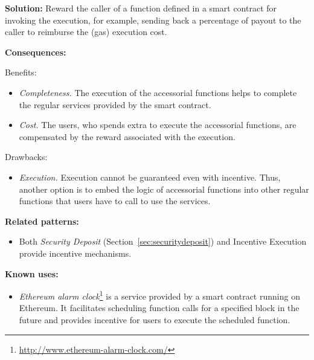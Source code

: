 \vspace{0.5em}\noindent \textbf{Solution:} 
Reward the caller of a function defined in a smart contract for invoking the execution, for example, sending back a percentage of payout to the caller to reimburse the (gas) execution cost. 

\vspace{0.5em}\noindent \textbf{Consequences:} 

Benefits:
\begin{itemize}
  \item \textit{Completeness.} The execution of the accessorial functions helps to complete the regular services provided by the smart contract.
  \item \textit{Cost.} The users, who spends extra to execute the accessorial functions, are compensated by the reward associated with the execution.
\end{itemize}

Drawbacks: 
\begin{itemize}
  \item \textit{Execution.} Execution cannot be guaranteed even with incentive. Thus, another option is to embed the logic of accessorial functions into other regular functions that users have to call to use the services.
\end{itemize}


\vspace{0.5em}\noindent \textbf{Related patterns:} 
\begin{itemize}
    \item Both \textit{Security Deposit} (Section~\ref{sec:securitydeposit}) and Incentive Execution provide incentive mechanisms.
\end{itemize}

\vspace{0.5em}\noindent \textbf{Known uses:}
\begin{itemize}
  \item \textit{Ethereum alarm clock}\footnote{\label{alarm}\url{http://www.ethereum-alarm-clock.com/}} is a service provided by a smart contract running on Ethereum. It facilitates scheduling function calls for a specified block in the future and provides incentive for users to execute the scheduled function. 
\end{itemize}


